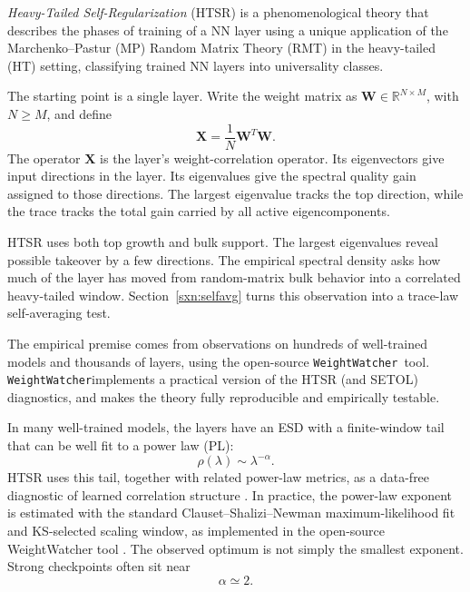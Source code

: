 \documentclass[10pt,twocolumn]{article}
\newcommand{\WW}{\texttt{WeightWatcher}}
\newcommand{\W}{\mathbf W}
\newcommand{\X}{\mathbf X}
\begin{document}
\emph{Heavy-Tailed Self-Regularization} (HTSR) is a phenomenological theory that describes the phases of training
of a NN layer using a unique application of the Marchenko--Pastur (MP)
Random Matrix Theory (RMT) in the heavy-tailed (HT) setting, classifying trained NN layers
into universality classes.\cite{MartinMahoneyJMLR2021}

The starting point is a single layer.
Write the weight matrix as $\W\in\mathbb R^{N\times M}$, with $N\ge M$, and define
\begin{equation}
\X=\frac{1}{N}\W^T\W.
\label{eq:Xdef}
\end{equation}
The operator $\X$ is the layer's weight-correlation operator. Its eigenvectors give input directions in the layer. Its eigenvalues give the spectral quality gain assigned to those directions. The largest eigenvalue tracks the top direction, while the trace tracks the total gain carried by all active eigencomponents.

HTSR uses both top growth and bulk support. The largest eigenvalues reveal possible takeover by a few directions. The empirical spectral density asks how much of the layer has moved from random-matrix bulk behavior into a correlated heavy-tailed window.
Section~\ref{sxn:selfavg} turns this observation into a trace-law self-averaging test.

The empirical premise comes from observations on hundreds of well-trained models and thousands of layers, using the open-source \WW~tool\cite{WeightWatcherTool}. \WW implements a practical version of the HTSR (and SETOL) diagnostics, and makes the theory fully reproducible and empirically testable.

In many well-trained models, the layers have an ESD with a finite-window tail that can be
well fit to a power law (PL):
\begin{equation}
\rho(\lambda)\sim\lambda^{-\alpha}.
\label{eq:rho_tail}
\end{equation}
HTSR uses this tail, together with related power-law metrics, as a data-free diagnostic of learned correlation structure \cite{MartinMahoneyICML2019,MartinMahoneyJMLR2021,MartinPengMahoney2021}. In practice, the power-law exponent is estimated with the standard Clauset--Shalizi--Newman maximum-likelihood fit and KS-selected scaling window, as implemented in the open-source WeightWatcher tool \cite{WeightWatcherTool,Clauset2009}. The observed optimum is not simply the smallest exponent. Strong checkpoints often sit near
\begin{equation}
\alpha\simeq2.
\label{eq:alphaobs}
\end{equation}
\end{document}
